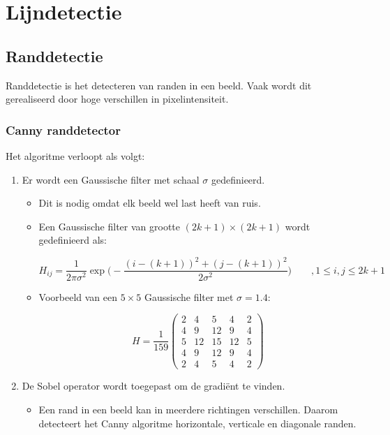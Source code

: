 \chapter{Lijndetectie}

\section{Randdetectie}
Randdetectie is het detecteren van randen in een beeld. Vaak wordt dit gerealiseerd door hoge verschillen in pixelintensiteit.
\subsection{Canny randdetector}
Het algoritme verloopt als volgt:
\begin{enumerate}
	\item Er wordt een Gaussische filter met schaal $\sigma$ gedefinieerd.
	\begin{itemize}
		\item Dit is nodig omdat elk beeld wel last heeft van ruis. 
		
		\item Een Gaussische filter van grootte $(2k + 1) \times (2k + 1)$ wordt gedefinieerd als:
		
		$$H_{ij} = \frac{1}{2\pi \sigma^2}\exp\bigg(-\frac{(i - (k + 1))^2 + (j - (k + 1))^2}{2\sigma^2}\bigg) \qquad, 1 \leq i, j \leq 2k + 1$$
		
		\item Voorbeeld van een $5 \times 5$ Gaussische filter met $\sigma = 1.4$:
		
		$$H = \frac{1}{159}\begin{pmatrix}
		2 & 4 & 5 & 4 & 2 \\
		4 & 9 & 12 & 9 & 4 \\
		5 & 12 & 15 & 12 & 5 \\
		4 & 9 & 12 & 9 & 4 \\
		2 & 4 & 5 & 4 & 2
		\end{pmatrix}$$
		
		
	\end{itemize}
	

	\item De Sobel operator wordt toegepast om de gradiënt te vinden.
	\begin{itemize}
		\item Een rand in een beeld kan in meerdere richtingen verschillen. Daarom detecteert het Canny algoritme horizontale, verticale en diagonale randen.
		

\end{itemize}
\end{enumerate}
